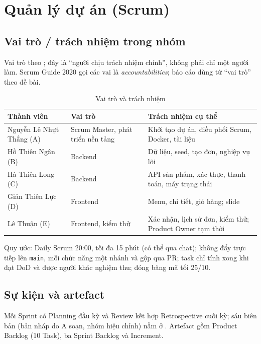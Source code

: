 \chapter{Quản lý dự án (Scrum)}\label{ch:quanly}
\section{Vai trò / trách nhiệm trong nhóm}\label{sec:se-vaitro}
Vai trò theo ; đây là ``người chịu trách nhiệm chính'', không phải chỉ một người làm. Scrum Guide 2020 gọi các vai là \emph{accountabilities}; báo cáo dùng từ ``vai trò'' theo đề bài.
\begin{table}[htbp]\centering
\caption{Vai trò và trách nhiệm}\label{tab:vaitro}
\begin{tabular}{@{}p{3.4cm}p{3.8cm}p{5.8cm}@{}}\toprule
\textbf{Thành viên} & \textbf{Vai trò} & \textbf{Trách nhiệm cụ thể} \\ \midrule
Nguyễn Lê Nhựt Thắng (A) & Scrum Master, phát triển nền tảng & Khởi tạo dự án, điều phối Scrum, Docker, tài liệu \\
Hồ Thiên Ngân (B) & Backend & Dữ liệu, seed, tạo đơn, nghiệp vụ lõi \\
Hà Thiên Long (C) & Backend & API sản phẩm, xác thực, thanh toán, máy trạng thái \\
Giản Thiên Lực (D) & Frontend & Menu, chi tiết, giỏ hàng; slide \\
Lê Thuận (E) & Frontend, kiểm thử & Xác nhận, lịch sử đơn, kiểm thử; Product Owner tạm thời \\ \bottomrule
\end{tabular}
\end{table}
Quy ước: Daily Scrum 20:00, tối đa 15 phút (có thể qua chat); không đẩy trực tiếp lên \texttt{main}, mỗi chức năng một nhánh và gộp qua PR; task chỉ tính xong khi đạt DoD và được người khác nghiệm thu; đóng băng mã tối 25/10.

\section{Sự kiện và artefact}\label{sec:se-suKien}
Mỗi Sprint có Planning đầu kỳ và Review kết hợp Retrospective cuối kỳ; sáu biên bản (bản nháp do A soạn, nhóm hiệu chỉnh) nằm ở . Artefact gồm Product Backlog (10 Task), ba Sprint Backlog và Increment.

